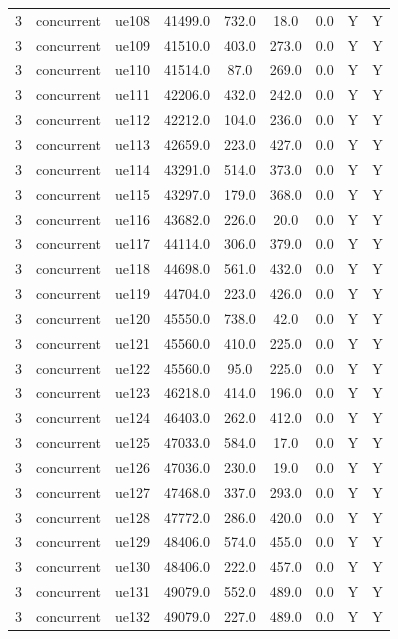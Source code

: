 \begin{table}[ht]
\begin{tabular}{|c|c|c|c|c|c|c|c|c|}
3 & concurrent & ue108 & 41499.0 & 732.0 & 18.0 & 0.0 & Y & Y \\
3 & concurrent & ue109 & 41510.0 & 403.0 & 273.0 & 0.0 & Y & Y \\
3 & concurrent & ue110 & 41514.0 & 87.0 & 269.0 & 0.0 & Y & Y \\
3 & concurrent & ue111 & 42206.0 & 432.0 & 242.0 & 0.0 & Y & Y \\
3 & concurrent & ue112 & 42212.0 & 104.0 & 236.0 & 0.0 & Y & Y \\
3 & concurrent & ue113 & 42659.0 & 223.0 & 427.0 & 0.0 & Y & Y \\
3 & concurrent & ue114 & 43291.0 & 514.0 & 373.0 & 0.0 & Y & Y \\
3 & concurrent & ue115 & 43297.0 & 179.0 & 368.0 & 0.0 & Y & Y \\
3 & concurrent & ue116 & 43682.0 & 226.0 & 20.0 & 0.0 & Y & Y \\
3 & concurrent & ue117 & 44114.0 & 306.0 & 379.0 & 0.0 & Y & Y \\
3 & concurrent & ue118 & 44698.0 & 561.0 & 432.0 & 0.0 & Y & Y \\
3 & concurrent & ue119 & 44704.0 & 223.0 & 426.0 & 0.0 & Y & Y \\
3 & concurrent & ue120 & 45550.0 & 738.0 & 42.0 & 0.0 & Y & Y \\
3 & concurrent & ue121 & 45560.0 & 410.0 & 225.0 & 0.0 & Y & Y \\
3 & concurrent & ue122 & 45560.0 & 95.0 & 225.0 & 0.0 & Y & Y \\
3 & concurrent & ue123 & 46218.0 & 414.0 & 196.0 & 0.0 & Y & Y \\
3 & concurrent & ue124 & 46403.0 & 262.0 & 412.0 & 0.0 & Y & Y \\
3 & concurrent & ue125 & 47033.0 & 584.0 & 17.0 & 0.0 & Y & Y \\
3 & concurrent & ue126 & 47036.0 & 230.0 & 19.0 & 0.0 & Y & Y \\
3 & concurrent & ue127 & 47468.0 & 337.0 & 293.0 & 0.0 & Y & Y \\
3 & concurrent & ue128 & 47772.0 & 286.0 & 420.0 & 0.0 & Y & Y \\
3 & concurrent & ue129 & 48406.0 & 574.0 & 455.0 & 0.0 & Y & Y \\
3 & concurrent & ue130 & 48406.0 & 222.0 & 457.0 & 0.0 & Y & Y \\
3 & concurrent & ue131 & 49079.0 & 552.0 & 489.0 & 0.0 & Y & Y \\
3 & concurrent & ue132 & 49079.0 & 227.0 & 489.0 & 0.0 & Y & Y \\

\end{tabular}
\end{table}
